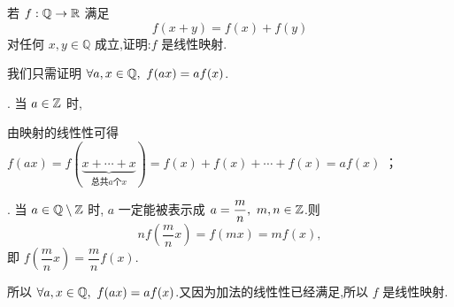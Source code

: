 \begin{problem}
若 $f: \mathbb{Q} \to \mathbb{R}$ 满足
\[
    f(x+y)=f(x)+f(y)
\]
对任何 $x,y\in\mathbb{Q}$ 成立,证明:$f$ 是线性映射.
    \begin{solution}
        我们只需证明 $\forall a,x \in \mathbb{Q}, \ f(ax) = af(x)$.
        
        . 当 $a \in \mathbb{Z}$ 时,

        由映射的线性性可得 $f(ax) = f(\underbrace{x + \cdots + x}_{\text{总共} a \text{个} x}) = f(x) + f(x) + \cdots + f(x) = af(x)$ ；

        . 当 $a \in \mathbb{Q} \setminus \mathbb{Z}$ 时, $a$ 一定能被表示成 $a = \dfrac{m}{n}, \ m,n \in \mathbb{Z}$.则
        \[
        nf\left( \dfrac{m}{n}x \right) = f(mx) = mf(x),
        \]
        即 $f\left( \dfrac{m}{n}x \right) = \dfrac{m}{n}f(x)$.

        所以 $\forall a,x \in \mathbb{Q}, \ f(ax) = af(x)$.又因为加法的线性性已经满足,所以 $f$ 是线性映射.
    \end{solution}
\end{problem}

